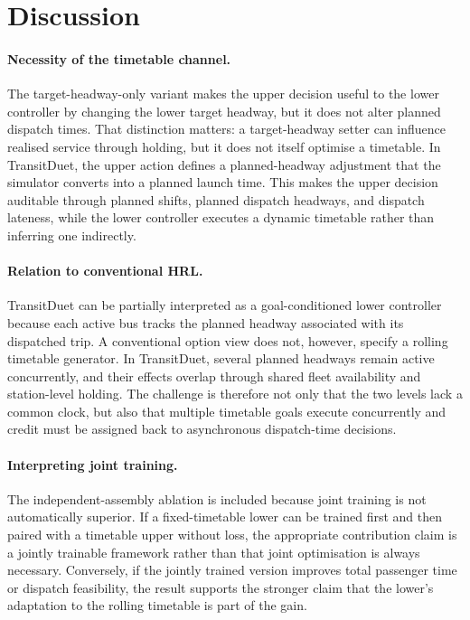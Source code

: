\section{Discussion}
\label{sec:discussion}

\paragraph{Necessity of the timetable channel.}
The target-headway-only variant makes the upper decision useful to the lower controller by changing the lower target headway, but it does not alter planned dispatch times. That distinction matters: a target-headway setter can influence realised service through holding, but it does not itself optimise a timetable. In TransitDuet, the upper action defines a planned-headway adjustment that the simulator converts into a planned launch time. This makes the upper decision auditable through planned shifts, planned dispatch headways, and dispatch lateness, while the lower controller executes a dynamic timetable rather than inferring one indirectly.

\paragraph{Relation to conventional HRL.}
TransitDuet can be partially interpreted as a goal-conditioned lower controller because each active bus tracks the planned headway associated with its dispatched trip. A conventional option view does not, however, specify a rolling timetable generator. In TransitDuet, several planned headways remain active concurrently, and their effects overlap through shared fleet availability and station-level holding. The challenge is therefore not only that the two levels lack a common clock, but also that multiple timetable goals execute concurrently and credit must be assigned back to asynchronous dispatch-time decisions.

\paragraph{Interpreting joint training.}
The independent-assembly ablation is included because joint training is not automatically superior. If a fixed-timetable lower can be trained first and then paired with a timetable upper without loss, the appropriate contribution claim is a jointly trainable framework rather than that joint optimisation is always necessary. Conversely, if the jointly trained version improves total passenger time or dispatch feasibility, the result supports the stronger claim that the lower's adaptation to the rolling timetable is part of the gain.

